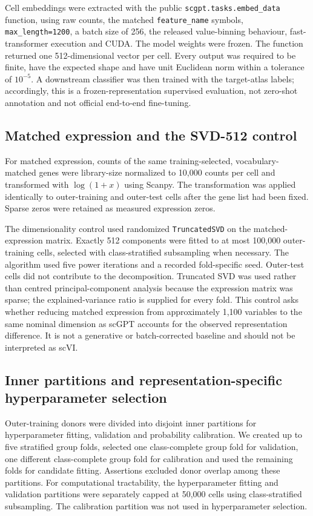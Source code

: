 Cell embeddings were extracted with the public \texttt{scgpt.tasks.embed\_data} function, using raw counts, the matched \texttt{feature\_name} symbols, \texttt{max\_length=1200}, a batch size of 256, the released value-binning behaviour, fast-transformer execution and CUDA. The model weights were frozen. The function returned one 512-dimensional vector per cell. Every output was required to be finite, have the expected shape and have unit Euclidean norm within a tolerance of $10^{-5}$. A downstream classifier was then trained with the target-atlas labels; accordingly, this is a frozen-representation supervised evaluation, not zero-shot annotation and not official end-to-end fine-tuning.

\subsection{Matched expression and the SVD-512 control}

For matched expression, counts of the same training-selected, vocabulary-matched genes were library-size normalized to 10,000 counts per cell and transformed with $\log(1+x)$ using Scanpy. The transformation was applied identically to outer-training and outer-test cells after the gene list had been fixed. Sparse zeros were retained as measured expression zeros.

The dimensionality control used randomized \texttt{TruncatedSVD} on the matched-expression matrix. Exactly 512 components were fitted to at most 100,000 outer-training cells, selected with class-stratified subsampling when necessary. The algorithm used five power iterations and a recorded fold-specific seed. Outer-test cells did not contribute to the decomposition. Truncated SVD was used rather than centred principal-component analysis because the expression matrix was sparse; the explained-variance ratio is supplied for every fold. This control asks whether reducing matched expression from approximately 1,100 variables to the same nominal dimension as scGPT accounts for the observed representation difference. It is not a generative or batch-corrected baseline and should not be interpreted as scVI.

\subsection{Inner partitions and representation-specific hyperparameter selection}

Outer-training donors were divided into disjoint inner partitions for hyperparameter fitting, validation and probability calibration. We created up to five stratified group folds, selected one class-complete group fold for validation, one different class-complete group fold for calibration and used the remaining folds for candidate fitting. Assertions excluded donor overlap among these partitions. For computational tractability, the hyperparameter fitting and validation partitions were separately capped at 50,000 cells using class-stratified subsampling. The calibration partition was not used in hyperparameter selection.

